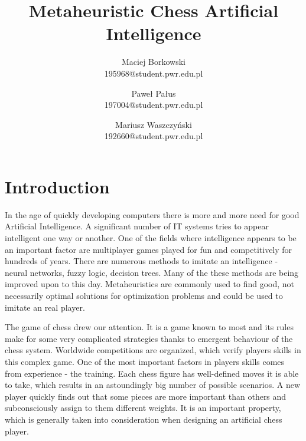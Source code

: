 \documentclass[pdftex]{article}
\date{}
\title{Metaheuristic Chess Artificial Intelligence}
\author{Maciej Borkowski\\ 195968@student.pwr.edu.pl \and Paweł Pałus\\ 197004@student.pwr.edu.pl  \and Mariusz Waszczyński\\  192660@student.pwr.edu.pl }
\begin{document}
\thispagestyle{empty}

\section{Introduction}
\label{sec:introduction}

In the age of quickly developing computers there is more and more need for good Artificial Intelligence. A significant number of IT systems tries to appear intelligent one way or another. One of the fields where intelligence appears to be an important factor are multiplayer games played for fun and competitively for hundreds of years. There are numerous methods to imitate an intelligence - neural networks, fuzzy logic, decision trees. Many of the these methods are being improved upon to this day. Metaheuristics are commonly used to find good, not necessarily optimal solutions for optimization problems and could be used to imitate an real player.

The game of chess drew our attention. It is a game known to most and its rules make for some very complicated strategies thanks to emergent behaviour of the chess system. Worldwide competitions are organized, which verify players skills in this complex game. One of the most important factors in players skills comes from experience - the training. Each chess figure has well-defined moves it is able to take, which results in an astoundingly big number of possible scenarios. A new player quickly finds out that some pieces are more important than others and subconsciously assign to them different weights. It is an important property, which is generally taken into consideration when designing an artificial chess player.~\cite{comparison}
\end{document}
